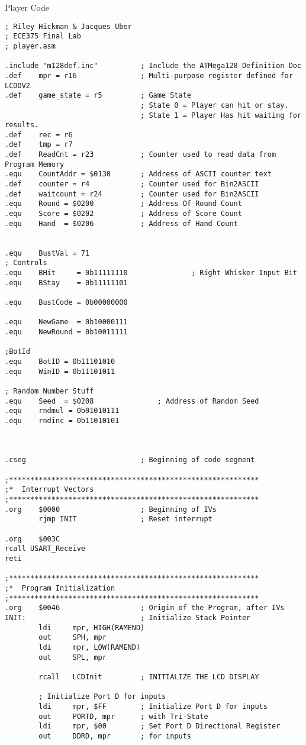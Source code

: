 \documentclass[10pt,letterpaper]{article}
\begin{document}
Player Code
\begin{verbatim}
; Riley Hickman & Jacques Uber
; ECE375 Final Lab
; player.asm

.include "m128def.inc"			; Include the ATMega128 Definition Doc
.def	mpr = r16				; Multi-purpose register defined for LCDDV2
.def	game_state = r5			; Game State
                                ; State 0 = Player can hit or stay.
                                ; State 1 = Player Has hit waiting for results.
.def    rec = r6
.def    tmp = r7
.def	ReadCnt = r23			; Counter used to read data from Program Memory
.equ	CountAddr = $0130		; Address of ASCII counter text
.def	counter = r4			; Counter used for Bin2ASCII
.def	waitcount = r24			; Counter used for Bin2ASCII
.equ	Round = $0200		    ; Address Of Round Count
.equ	Score = $0202		    ; Address of Score Count
.equ	Hand  = $0206		    ; Address of Hand Count


.equ    BustVal = 71
; Controls
.equ	BHit     = 0b11111110				; Right Whisker Input Bit
.equ	BStay    = 0b11111101

.equ    BustCode = 0b00000000

.equ    NewGame  = 0b10000111
.equ    NewRound = 0b10011111

;BotId
.equ    BotID = 0b11101010
.equ    WinID = 0b11101011

; Random Number Stuff
.equ    Seed  = $0208               ; Address of Random Seed
.equ    rndmul = 0b01010111
.equ    rndinc = 0b11010101



.cseg							; Beginning of code segment

;***********************************************************
;*	Interrupt Vectors
;***********************************************************
.org	$0000					; Beginning of IVs
		rjmp INIT				; Reset interrupt

.org    $003C
rcall USART_Receive
reti

;***********************************************************
;*	Program Initialization
;***********************************************************
.org	$0046					; Origin of the Program, after IVs
INIT:							; Initialize Stack Pointer
		ldi		mpr, HIGH(RAMEND)
		out		SPH, mpr
		ldi		mpr, LOW(RAMEND)
		out		SPL, mpr

		rcall	LCDInit			; INITIALIZE THE LCD DISPLAY

        ; Initialize Port D for inputs
        ldi     mpr, $FF        ; Initialize Port D for inputs
        out     PORTD, mpr      ; with Tri-State
        ldi     mpr, $00        ; Set Port D Directional Register
        out     DDRD, mpr       ; for inputs


\end{verbatim}
\end{document}
